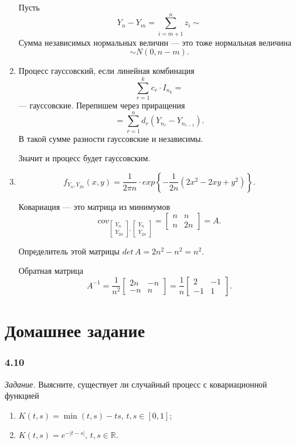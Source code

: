 \begin{enumerate}[label=\alph*)]
  Пусть
  $$Y_n - Y_m =
    \sum \limits_{i = m + 1}^n z_i \sim $$
  Сумма независимых нормальных величин --- это тоже нормальная величина
  $$ \sim N \left( 0, n - m \right).$$
  \item Процесс гауссовский, если линейная комбинация
  $$ \sum \limits_{r = 1}^k c_r \cdot I_{n_k} =$$
  --- гауссовские.
  Перепишем через приращения
  $$= \sum \limits_{r = 1}^n d_r \left( Y_{n_r} - Y_{n_{r - 1}} \right).$$
  В такой сумме разности гауссовские и независимы.

  Значит и процесс будет гауссовским.
  \item $$f_{Y_n, Y_{2n}} \left( x, y \right) =
    \frac{1}{2 \pi n} \cdot exp \left\{ -\frac{1}{2n} \left( 2x^2 - 2xy + y^2 \right) \right\}.$$

  Ковариация --- это матрица из минимумов
  $$cov_{\begin{bmatrix} Y_n \\ Y_{2n} \end{bmatrix}, \begin{bmatrix} Y_n \\ Y_{2n} \end{bmatrix}} =
    \begin{bmatrix}
      n & n \\
      n & 2n
    \end{bmatrix} =
    A.$$

  Определитель этой матрицы $det \, A = 2n^2 - n^2 = n^2$.

  Обратная матрица
  $$A^{-1} =
    \frac{1}{n^2}
    \begin{bmatrix}
      2n & -n \\
      -n & n
    \end{bmatrix} =
    \frac{1}{n}
    \begin{bmatrix}
      2 & -1 \\
      -1 & 1
    \end{bmatrix}.$$
\end{enumerate}

\section*{Домашнее задание}

\subsubsection*{4.10}

\textit{Задание.}
Выясните, существует ли случайный процесс с ковариационной функцией
\begin{enumerate}[label=\alph*)]
  \item $K \left( t, s \right) = \min \left( t, s \right) - ts, \, t, s \in \left[ 0, 1 \right] $;
  \item $K \left( t, s \right) = e^{- \left| t - s \right| }, \, t, s \in \mathbb{R}$.
\end{enumerate}

